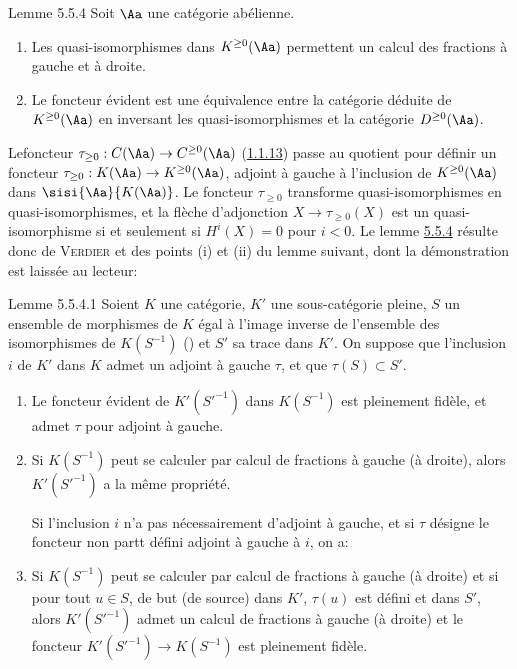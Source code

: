 \begin{enonce*}{Lemme 5.5.4}
Soit $\Aa$ une catégorie abélienne.
\begin{enumerate}
\renewcommand{\theenumi}{\roman{enumi}}
\renewcommand{\labelenumi}{(\theenumi)}
\item Les quasi-isomorphismes dans $K^{\geq 0}(\Aa)$
permettent un calcul des fractions à gauche et à droite.

\item Le foncteur évident est une équivalence entre la catégorie
déduite de $K^{\geq 0}(\Aa)$ en inversant les
quasi-isomorphismes et la catégorie $D^{\geq 0}(\Aa)$.
\end{enumerate}
\end{enonce*}

Le\pageoriginale foncteur $\tau_{\geq 0}:C(\Aa)\rightarrow
C^{\geq 0}(\Aa)$ (\hyperref[XVII.def1.1.13]{1.1.13}) passe au quotient pour définir un
foncteur $\tau_{\geq 0}:K(\Aa)\rightarrow K^{\geq
0}(\Aa)$, adjoint à gauche à l'inclusion de $K^{\geq
0}(\Aa)$ dans $\sisi{\Aa}{K(\Aa)}$. Le foncteur $\tau_{\geq 0}$
transforme quasi-isomorphismes en quasi-isomorphismes, et la flèche
d'adjonction $X\rightarrow \tau_{\geq 0}(X)$ est un quasi-isomorphisme
si et seulement si $H^{i}(X)=0$ pour $i<0$. Le lemme
\hyperref[XVII.lem5.5.4]{5.5.4} résulte
donc de \textsc{Verdier} \cite{CD} et des points (i) et (ii) du lemme suivant, dont
la démonstration est laissée au lecteur:

\begin{enonce*}{Lemme 5.5.4.1}
Soient $K$ une catégorie, $K'$ une sous-catégorie pleine, $S$ un
ensemble de morphismes de $K$ égal à l'image inverse de l'ensemble des
isomorphismes de $K(S^{-1})$ (\cf \cite[]{GZ}) et $S'$ sa
trace dans $K'$. On suppose que l'inclusion $i$ de $K'$ dans $K$ admet
un adjoint à gauche $\tau$, et que $\tau(S)\subset S'$.
\begin{enumerate}
\renewcommand{\theenumi}{\roman{enumi}}
\renewcommand{\labelenumi}{(\theenumi)}
\item Le foncteur évident de $K'({S'}^{-1})$ dans $K(S^{-1})$ est
pleinement fidèle, et admet $\tau$ pour adjoint à gauche.

\item Si $K(S^{-1})$ peut se calculer par calcul de fractions à gauche
(\resp à droite), alors $K'({S'}^{-1})$ a la même propriété.

Si l'inclusion $i$ n'a pas nécessairement d'adjoint à gauche, et si
$\tau$ désigne le foncteur non partt défini adjoint à gauche à $i$,
on a:

\item Si $K(S^{-1})$ peut se calculer par calcul de fractions à gauche
(\resp à droite) et si pour tout $u\in S$, de but (\resp de source)
dans $K'$, $\tau(u)$ est défini et dans $S'$, alors $K'({S'}^{-1})$
admet un calcul de fractions à gauche (\resp à droite) et le foncteur
$K'({S'}^{-1})\rightarrow K(S^{-1})$ est pleinement fidèle.
\end{enumerate}
\end{enonce*}

